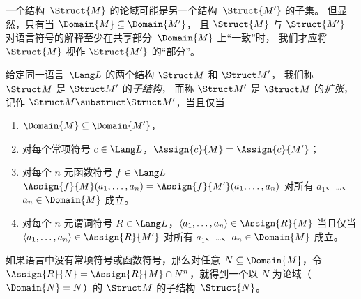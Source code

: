 \documentclass[../../../include/open-logic-section]{subfiles}
\begin{document}

一个结构~$\Struct{M}$ 的论域可能是另一个结构~$\Struct{M'}$ 的子集。
但显然，只有当 $\Domain{M} \subseteq \Domain{M'}$，
且 $\Struct{M}$ 与 $\Struct{M'}$ 对语言符号的解释至少在共享部分~$\Domain{M}$ 上“一致”时，
我们才应将 $\Struct{M}$ 视作 $\Struct{M'}$ 的“部分”。

\begin{defn}
给定同一语言~$\Lang L$ 的两个结构 $\Struct M$ 和 $\Struct M'$，
我们称 $\Struct M$ 是 $\Struct M'$ 的\emph{子结构}，
而称 $\Struct M'$ 是 $\Struct M$ 的\emph{扩张}，
记作 $\Struct M \substruct \Struct M'$，当且仅当
\begin{enumerate}
\item $\Domain{M} \subseteq \Domain{M'}$，
\item 对每个常项符号 $c \in \Lang L$，$\Assign{c}{M} =
    \Assign{c}{M'}$；
\item 对每个 $n$ 元函数符号 $f \in \Lang L$
  $\Assign{f}{M}(a_1, \dots, a_n) = \Assign{f}{M'}(a_1, \dots, a_n)$
  对所有 $a_1$、\ldots、$a_n \in \Domain{M}$ 成立。
\item 对每个 $n$ 元谓词符号 $R \in \Lang L$，$\langle
  a_1, \dots, a_n\rangle \in \Assign{R}{M}$ 当且仅当 $\langle a_1, \dots,
  a_n\rangle \in \Assign{R}{M'}$ 对所有 $a_1$、\ldots、$a_n \in
  \Domain{M}$ 成立。
\end{enumerate}
\end{defn}

\begin{rem}
如果语言中没有常项符号或函数符号，那么对任意 $N
\subseteq \Domain{M}$，令 $\Assign{R}{N} =
\Assign{R}{M} \cap N^n$，就得到一个以 $N$ 为论域（$\Domain{N} = N$）的 $\Struct M$ 的子结构~$\Struct{N}$。
\end{rem}

\end{document}
